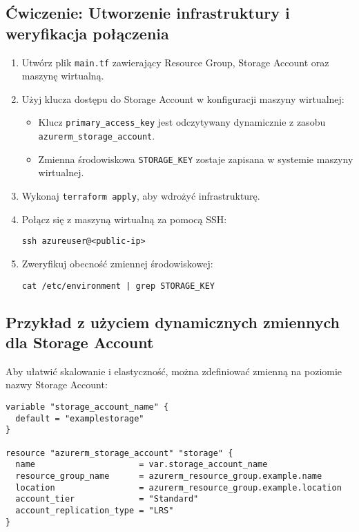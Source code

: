 \documentclass{article}
\begin{document}
\subsection{Ćwiczenie: Utworzenie infrastruktury i weryfikacja połączenia}
\begin{enumerate}
    \item Utwórz plik \texttt{main.tf} zawierający Resource Group, Storage Account oraz maszynę wirtualną.
    \item Użyj klucza dostępu do Storage Account w konfiguracji maszyny wirtualnej:
    \begin{itemize}
        \item Klucz \texttt{primary\_access\_key} jest odczytywany dynamicznie z zasobu \texttt{azurerm\_storage\_account}.
        \item Zmienna środowiskowa \texttt{STORAGE\_KEY} zostaje zapisana w systemie maszyny wirtualnej.
    \end{itemize}
    \item Wykonaj \texttt{terraform apply}, aby wdrożyć infrastrukturę.
    \item Połącz się z maszyną wirtualną za pomocą SSH:
    \begin{lstlisting}
ssh azureuser@<public-ip>
    \end{lstlisting}
    \item Zweryfikuj obecność zmiennej środowiskowej:
    \begin{lstlisting}
cat /etc/environment | grep STORAGE_KEY
    \end{lstlisting}
\end{enumerate}

\subsection{Przykład z użyciem dynamicznych zmiennych dla Storage Account}
Aby ułatwić skalowanie i elastyczność, można zdefiniować zmienną na poziomie nazwy Storage Account:
\begin{lstlisting}
variable "storage_account_name" {
  default = "examplestorage"
}

resource "azurerm_storage_account" "storage" {
  name                     = var.storage_account_name
  resource_group_name      = azurerm_resource_group.example.name
  location                 = azurerm_resource_group.example.location
  account_tier             = "Standard"
  account_replication_type = "LRS"
}
\end{lstlisting}
\end{document}
